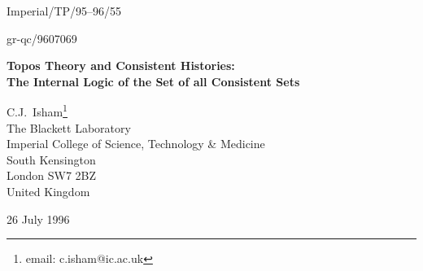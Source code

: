 \documentclass[12pt]{article}
\newcommand{\ie}{{\em i.e.,\ }}
\newcommand{\B}{{\cal B}}
\newcommand{\UP}{{\cal UP}}
\begin{document}
\begin{titlepage}

\hspace{8truecm}Imperial/TP/95--96/55

\hspace{8truecm}gr-qc/9607069

\begin{center}
        {\large\bf Topos Theory and Consistent Histories:\\[7pt]
			The Internal Logic of the Set of all Consistent Sets}
\end{center}
\vspace{0.8 truecm}
\begin{center}
        C.J.~Isham\footnote{email: c.isham@ic.ac.uk}\\[15pt]
        The Blackett Laboratory\\
        Imperial College of Science, Technology \& Medicine\\
        South Kensington\\
        London SW7 2BZ\\
        United Kingdom\\
\end{center}

\begin{center} 26 July 1996 \end{center}

\begin{abstract} 
A major problem in the consistent-histories approach to quantum
theory is contending with the potentially large number of consistent
sets of history propositions. One possibility is to find a scheme in
which a unique set is selected in some way. However, in this paper
we consider the alternative approach in which all consistent sets
are kept, leading to a type of `many world-views' picture of the
quantum theory.  It is shown that a natural way of handling this
situation is to employ the theory of varying sets (presheafs) on the
space $\B$ of all Boolean subalgebras of the orthoalgebra $\UP$ of
history propositions. This approach automatically includes the
feature whereby probabilistic predictions are meaningful only in the
context of a consistent set of history propositions.  More
strikingly, it leads to a picture in which the `truth values', or
`semantic values' of such contextual predictions are not just
two-valued (\ie true and false) but instead lie in a larger logical
algebra---a Heyting algebra---whose structure is determined by the
space $\B$ of Boolean subalgebras of $\UP$.

	This topos-theoretic structure thereby gives a coherent
mathematical framework in which to understand the internal logic of
the many world-views picture that arises naturally in the approach
to quantum theory based on the ideas of consistent histories.
\end{abstract}
 
\end{titlepage}
\end{document}
